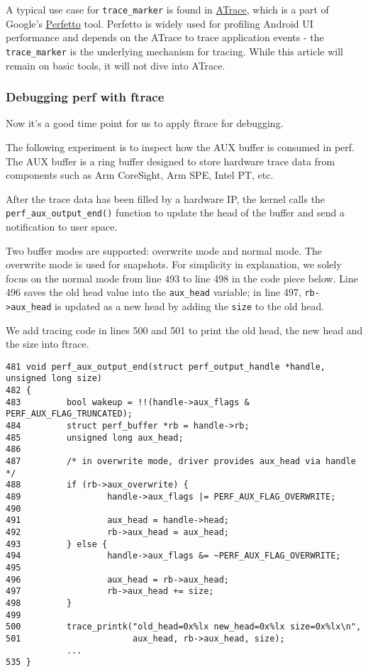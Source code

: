 \documentclass[11pt]{diazessay} %
\def\code#1{\texttt{#1}}
\begin{document}
A typical use case for \code{trace\_marker} is found in
\href{https://perfetto.dev/docs/data-sources/atrace}{ATrace}, which is a
part of Google's \href{https://ui.perfetto.dev/}{Perfetto} tool. Perfetto
is widely used for profiling Android UI performance and depends on the
ATrace to trace application events - the \code{trace\_marker} is the
underlying mechanism for tracing. While this article will remain on
basic tools, it will not dive into ATrace.

\subsubsection*{Debugging perf with ftrace}

Now it's a good time point for us to apply ftrace for debugging.

The following experiment is to inspect how the AUX buffer is consumed in perf.
The AUX buffer is a ring buffer designed to store hardware trace data from
components such as Arm CoreSight, Arm SPE, Intel PT, etc.

After the trace data has been filled by a hardware IP, the kernel calls the
\code{perf\_aux\_output\_end()} function to update the head of the buffer and
send a notification to user space.

Two buffer modes are supported: overwrite mode and normal mode. The overwrite
mode is used for snapshots. For simplicity in explanation, we solely focus on
the normal mode from line 493 to line 498 in the code piece below.
Line 496 saves the old head value into the \code{aux\_head} variable; in line
497, \code{rb->aux\_head} is updated as a new head by adding the \code{size}
to the old head.

We add tracing code in lines 500 and 501 to print the old head, the new head
and the size into ftrace.

\begin{lstlisting}
481 void perf_aux_output_end(struct perf_output_handle *handle, unsigned long size)
482 {
483         bool wakeup = !!(handle->aux_flags & PERF_AUX_FLAG_TRUNCATED);
484         struct perf_buffer *rb = handle->rb;
485         unsigned long aux_head;
486 
487         /* in overwrite mode, driver provides aux_head via handle */
488         if (rb->aux_overwrite) {
489                 handle->aux_flags |= PERF_AUX_FLAG_OVERWRITE;
490 
491                 aux_head = handle->head;
492                 rb->aux_head = aux_head;
493         } else {
494                 handle->aux_flags &= ~PERF_AUX_FLAG_OVERWRITE;
495 
496                 aux_head = rb->aux_head;
497                 rb->aux_head += size;
498         }
499 
500         trace_printk("old_head=0x%lx new_head=0x%lx size=0x%lx\n",
501                      aux_head, rb->aux_head, size);
            ...
535 }
\end{lstlisting}
\end{document}
